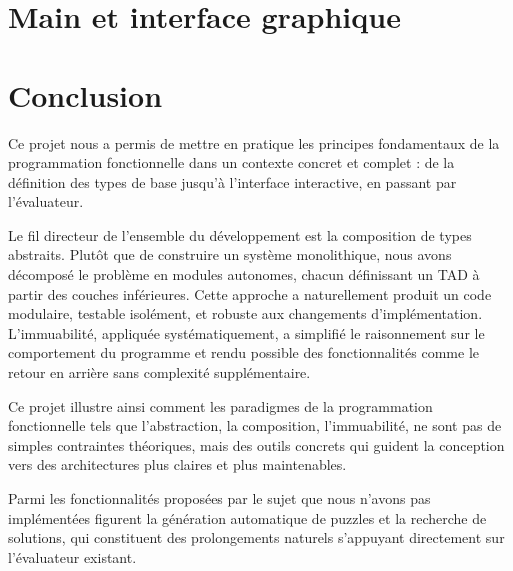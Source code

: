 \documentclass{article}
\begin{document}
\section{Main et interface graphique}



\section*{Conclusion}

Ce projet nous a permis de mettre en pratique les principes fondamentaux de la programmation fonctionnelle dans un contexte concret et complet : de la définition des types de base jusqu'à l'interface interactive, en passant par l'évaluateur.

Le fil directeur de l'ensemble du développement est la composition de types abstraits. Plutôt que de construire un système monolithique, nous avons décomposé le problème en modules autonomes, chacun définissant un TAD à partir des couches inférieures. Cette approche a naturellement produit un code modulaire, testable isolément, et robuste aux changements d'implémentation. L'immuabilité, appliquée systématiquement, a simplifié le raisonnement sur le comportement du programme et rendu possible des fonctionnalités comme le retour en arrière sans complexité supplémentaire.

Ce projet illustre ainsi comment les paradigmes de la programmation fonctionnelle tels que l’abstraction, la composition, l’immuabilité, ne sont pas de simples contraintes théoriques, mais des outils concrets qui guident la conception vers des architectures plus claires et plus maintenables.

Parmi les fonctionnalités proposées par le sujet que nous n'avons pas implémentées figurent la génération automatique de puzzles et la recherche de solutions, qui constituent des prolongements naturels s'appuyant directement sur l'évaluateur existant.
\end{document}
